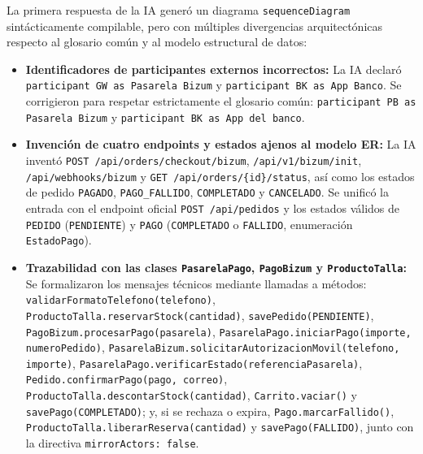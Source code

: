 La primera respuesta de la IA generó un diagrama \texttt{sequenceDiagram} sintácticamente compilable, pero con múltiples divergencias arquitectónicas respecto al glosario común y al modelo estructural de datos:
\begin{itemize}[leftmargin=*,nosep]
\item \textbf{Identificadores de participantes externos incorrectos:} La IA declaró \texttt{participant GW as Pasarela Bizum} y \texttt{participant BK as App Banco}. Se corrigieron para respetar estrictamente el glosario común: \texttt{participant PB as Pasarela Bizum} y \texttt{participant BK as App del banco}.
\item \textbf{Invención de cuatro endpoints y estados ajenos al modelo ER:} La IA inventó \texttt{POST /api/orders/checkout/bizum}, \texttt{/api/v1/bizum/init}, \texttt{/api/webhooks/bizum} y \texttt{GET /api/orders/\{id\}/status}, así como los estados de pedido \texttt{PAGADO}, \texttt{PAGO\_FALLIDO}, \texttt{COMPLETADO} y \texttt{CANCELADO}. Se unificó la entrada con el endpoint oficial \texttt{POST /api/pedidos} y los estados válidos de \texttt{PEDIDO} (\texttt{PENDIENTE}) y \texttt{PAGO} (\texttt{COMPLETADO} o \texttt{FALLIDO}, enumeración \texttt{EstadoPago}).
\item \textbf{Trazabilidad con las clases \texttt{PasarelaPago}, \texttt{PagoBizum} y \texttt{ProductoTalla}:} Se formalizaron los mensajes técnicos mediante llamadas a métodos: \texttt{validarFormatoTelefono(telefono)}, \texttt{ProductoTalla.reservarStock(cantidad)}, \texttt{savePedido(PENDIENTE)}, \texttt{PagoBizum.procesarPago(pasarela)}, \texttt{PasarelaPago.iniciarPago(importe, numeroPedido)}, \texttt{PasarelaBizum.solicitarAutorizacionMovil(telefono, importe)}, \texttt{PasarelaPago.verificarEstado(referenciaPasarela)}, \texttt{Pedido.confirmarPago(pago, correo)}, \texttt{ProductoTalla.descontarStock(cantidad)}, \texttt{Carrito.vaciar()} y \texttt{savePago(COMPLETADO)}; y, si se rechaza o expira, \texttt{Pago.marcarFallido()}, \texttt{ProductoTalla.liberarReserva(cantidad)} y \texttt{savePago(FALLIDO)}, junto con la directiva \texttt{mirrorActors: false}.
\end{itemize}
